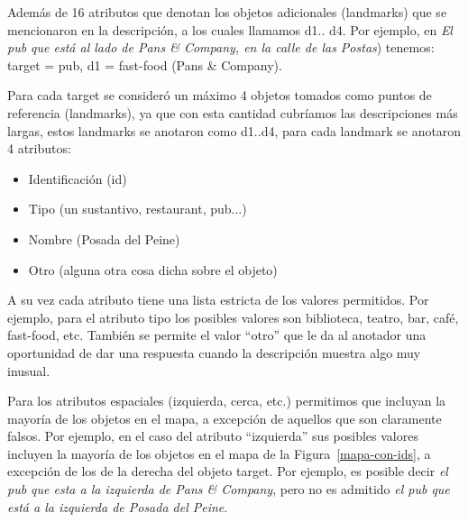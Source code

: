 \noindent
Adem\'as de 16 atributos que denotan los objetos adicionales (landmarks) que se mencionaron en la descripci\'on, a los cuales llamamos d1.. d4. Por ejemplo, en {\it El pub que est\'a al lado de Pans \& Company, en la calle de las Postas}) tenemos: target = pub, d1 = fast-food (Pans \& Company).%

Para cada target se consider\'o un m\'aximo 4 objetos tomados como puntos de referencia (landmarks), ya que con esta cantidad cubr\'iamos las descripciones m\'as largas, estos landmarks se anotaron como d1..d4, para cada landmark se anotaron 4 atributos:
\begin{itemize}
  \item Identificaci\'on (id)\\[-2em]
  \item Tipo (un sustantivo, restaurant, pub...)\\[-2em]
  \item Nombre (Posada del Peine)\\[-2em]
  \item Otro (alguna otra cosa dicha sobre el objeto)
\end{itemize}

A su vez cada atributo tiene una lista estricta de los valores permitidos. Por ejemplo, para el atributo tipo los posibles valores son biblioteca, teatro, bar, caf\'e, fast-food, etc. Tambi\'en se permite el valor ``otro'' que le da al anotador una oportunidad de dar una respuesta cuando la descripci\'on muestra algo muy inusual.

Para los atributos espaciales (izquierda, cerca, etc.) permitimos que incluyan la mayor\'{i}a de los objetos en el mapa, a excepci\'on de aquellos que son claramente falsos. Por ejemplo, en el caso del atributo ``izquierda'' sus posibles valores incluyen la mayor\'{i}a de los objetos en el mapa de la Figura~\ref{mapa-con-ids}, a excepci\'on de los de la derecha del objeto target. Por ejemplo, es posible decir {\it el pub que esta a la izquierda de Pans \& Company}, pero no es admitido {\it el pub que est\'a a la izquierda de Posada del Peine}.

